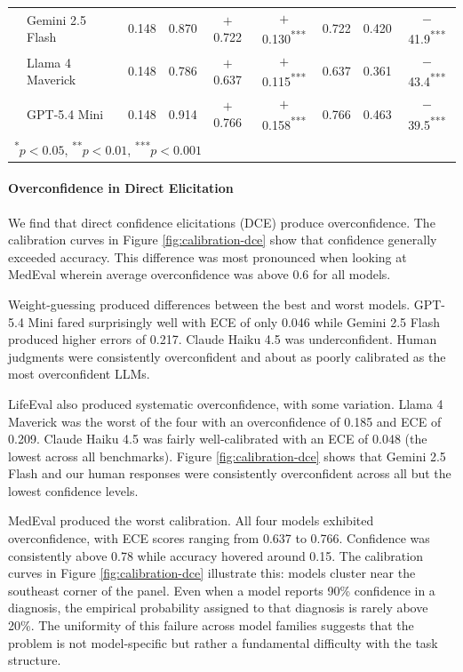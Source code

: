 \documentclass{article}
\begin{document}
\begin{table}[t]
\begin{tabular}{llccccccc}
 & Gemini 2.5 Flash     & 0.148 & 0.870 & $+$0.722 & $+$0.130\textsuperscript{***} & 0.722 & 0.420 & $-$41.9\textsuperscript{***} \\
 & Llama 4 Maverick     & 0.148 & 0.786 & $+$0.637 & $+$0.115\textsuperscript{***} & 0.637 & 0.361 & $-$43.4\textsuperscript{***} \\
 & GPT-5.4 Mini         & 0.148 & 0.914 & $+$0.766 & $+$0.158\textsuperscript{***} & 0.766 & 0.463 & $-$39.5\textsuperscript{***} \\
\bottomrule
\multicolumn{9}{l}{\footnotesize \textsuperscript{*}$p<0.05$, \textsuperscript{**}$p<0.01$, \textsuperscript{***}$p<0.001$} \\
\end{tabular}
\end{table}

\paragraph{Overconfidence in Direct Elicitation}
We find that direct confidence elicitations (DCE) produce overconfidence. The calibration curves in Figure \ref{fig:calibration-dce} show that  confidence generally exceeded accuracy. This difference was most pronounced when looking at MedEval wherein average overconfidence was above 0.6 for all models. 

Weight-guessing produced differences between the best and worst models. GPT-5.4 Mini fared surprisingly well with ECE of only 0.046 while Gemini 2.5 Flash produced higher errors of 0.217. Claude Haiku 4.5 was underconfident. Human judgments were consistently overconfident and about as poorly calibrated as the most overconfident LLMs.

LifeEval also produced systematic overconfidence, with some variation. Llama 4 Maverick was the worst of the four with an overconfidence of 0.185 and ECE of 0.209. Claude Haiku 4.5 was fairly well-calibrated with an ECE of 0.048 (the lowest across all benchmarks). Figure \ref{fig:calibration-dce} shows that Gemini 2.5 Flash and our human responses were consistently overconfident across all but the lowest confidence levels.

MedEval produced the worst calibration. All four models exhibited overconfidence, with ECE scores ranging from 0.637 to 0.766. Confidence was consistently above 0.78 while accuracy hovered around 0.15. The calibration curves in Figure \ref{fig:calibration-dce} illustrate this: models cluster near the southeast corner of the panel. Even when a model reports 90\% confidence in a diagnosis, the empirical probability assigned to that diagnosis is rarely above 20\%. The uniformity of this failure across model families suggests that the problem is not model-specific but rather a fundamental difficulty with the task structure.
\end{document}

